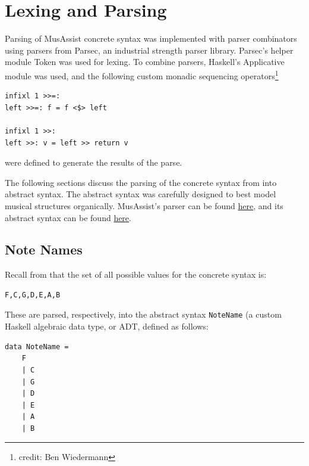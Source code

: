 \documentclass{report}
\newcommand\param[1]{\textttu{<#1>}}
\begin{document}
\chapter{Lexing and Parsing}

Parsing of MusAssist concrete syntax was implemented with parser combinators using parsers from Parsec, an industrial strength parser library. Parsec's helper module Token was used for lexing. To combine parsers, Haskell's Applicative module was used, and the following custom monadic sequencing operators\footnote{credit: Ben Wiedermann}
\begin{verbatim}
infixl 1 >>=:
left >>=: f = f <$> left

infixl 1 >>:
left >>: v = left >> return v
\end{verbatim}

were defined to generate the results of the parse.

The following sections discuss the parsing of the concrete syntax from  into abstract syntax. The abstract syntax was carefully designed to best model musical structures organically. MusAssist's parser can be found \href{https://github.com/ilanashapiro/MusAssist/blob/main/app/Parser.hs}{here}, and its abstract  syntax can be found \href{https://github.com/ilanashapiro/MusAssist/blob/main/app/MusAssistAST.hs}{here}.
\section{Note Names}
Recall from  that the set of all possible values for the concrete syntax \param{NOTENAME} is:
\begin{verbatim}
F,C,G,D,E,A,B
\end{verbatim}

These are parsed, respectively, into the abstract syntax \verb.NoteName. (a custom Haskell algebraic data type, or ADT, defined as follows:
\newpage
\begin{verbatim}
data NoteName = 
    F
    | C
    | G 
    | D 
    | E 
    | A 
    | B
\end{verbatim}
\end{document}
